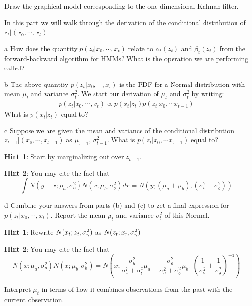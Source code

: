 \documentclass[expanded]{lkx_pset}
\begin{document}
\begin{parts}
	\begin{part}{1} Draw the graphical model corresponding to the one-dimensional Kalman filter.
	\end{part}
	\begin{part}{2} In this part we will walk through the derivation of the conditional distribution of $z_t|(x_0, \cdots, x_{t})$.
	\end{part}
	\begin{parts}
		\begin{part}{a} How does the quantity $p(z_t| x_0, \cdots, x_{t})$ relate to $\alpha_t(z_t)$ and $\beta_t(z_t)$ from the forward-backward algorithm for HMMs?  What is the operation we are performing called?
		\end{part}
		\begin{part}{b} The above quantity $p(z_t|x_0, \cdots, x_t)$ is the PDF for a Normal distribution with mean $\mu_t$ and variance $\sigma_t^2$. We start our derivation of $\mu_t$ and $\sigma_t^2$ by writing:
			\begin{align*}
				p(z_t|x_0, \cdots, x_t) \propto p(x_t|z_t)p(z_t|x_0, \cdots x_{t-1})
			\end{align*}
			What is $p(x_t|z_t)$ equal to?
		\end{part}
		\begin{part}{c} Suppose we are given the mean and variance of the conditional distribution $z_{t-1}|(x_0, \cdots, x_{t-1})$ as $\mu_{t-1}$, $\sigma^2_{t-1}$. What is $p(z_t|x_0, \cdots x_{t-1})$ equal to?
		\end{part}

		\textbf{Hint 1}: Start by marginalizing out over $z_{t-1}$.

		\textbf{Hint 2}: You may cite the fact that
		\[\int N(y-x ; \mu_a, \sigma^2_a)N(x ; \mu_b, \sigma^2_b)dx = N(y ; (\mu_a + \mu_b), (\sigma^2_a + \sigma^2_b))\]
		\begin{part}{d} Combine your answers from parts (b) and (c) to get a final expression for $p(z_t|x_0, \cdots, x_t)$. Report the mean $\mu_t$ and variance $\sigma_t^2$ of this Normal.
		\end{part}

		\textbf{Hint 1}: Rewrite $N(x_t; z_t, \sigma_{\gamma}^2)$ as $N(z_t; x_t, \sigma_{\gamma}^2)$.

		\textbf{Hint 2}: You may cite the fact that
		\[N(x; \mu_a, \sigma^2_a)N(x; \mu_b, \sigma^2_b) = N\left(x; \frac{\sigma^2_b}{\sigma^2_a+\sigma^2_b}\mu_a + \frac{\sigma^2_a}{\sigma^2_a+\sigma^2_b}\mu_b, \ \left(\frac{1}{\sigma^2_a} + \frac{1}{\sigma^2_b}\right)^{-1}\right)\]
	\end{parts}
	\begin{part}{3}Interpret $\mu_t$ in terms of how it combines observations from the past with the current observation.
	\end{part}
\end{parts}
\end{document}
